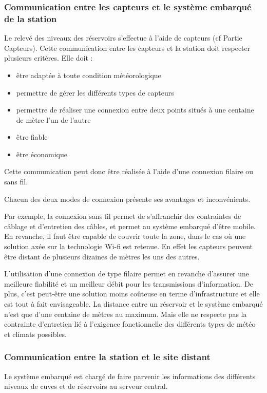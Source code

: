 \documentclass{mise_en_page}
\begin{document}
\subsubsection{Communication entre les capteurs et le système embarqué de la
station}
Le relevé des niveaux des réservoirs s’effectue à l’aide de capteurs (cf
Partie Capteurs). Cette communication entre les capteurs et la station
doit respecter plusieurs critères. Elle doit : 

\begin{itemize}
\item être adaptée à toute condition météorologique
\item permettre de gérer les différents types de capteurs
\item permettre de réaliser une connexion entre deux points situés à une
centaine de mètre l’un de l’autre
\item être fiable
\item être économique
\end{itemize}
Cette communication peut donc être réalisée à l’aide d’une connexion
filaire ou sans fil.

Chacun des deux modes de connexion présente ses avantages et
inconvénients. 

Par exemple, la connexion sans fil permet de s’affranchir des
contraintes de câblage et d'entretien des câbles, et
permet au système embarqué d’être mobile. En revanche, il faut être
capable de couvrir toute la zone, dans le cas où une solution axée sur
la technologie Wi-fi est retenue. En effet les capteurs peuvent être
distant de plusieurs dizaines de mètres les uns des autres.

L’utilisation d’une connexion de type filaire permet en revanche
d’assurer une meilleure fiabilité et un meilleur débit pour les
transmissions d’information. De plus, c’est peut-être une solution
moins coûteuse en terme d’infrastructure et elle est tout à fait
envisageable. La distance entre un réservoir et le système embarqué
n’est que d’une centaine de mètres au maximum. Mais elle ne respecte
pas la contrainte d’entretien lié à l’exigence fonctionnelle des
différents types de météo et climats possibles.

\subsubsection{Communication entre la station et le site distant}
Le système embarqué est chargé de faire parvenir les informations des
différents niveaux de cuves et de réservoirs au serveur central. 
\end{document}
